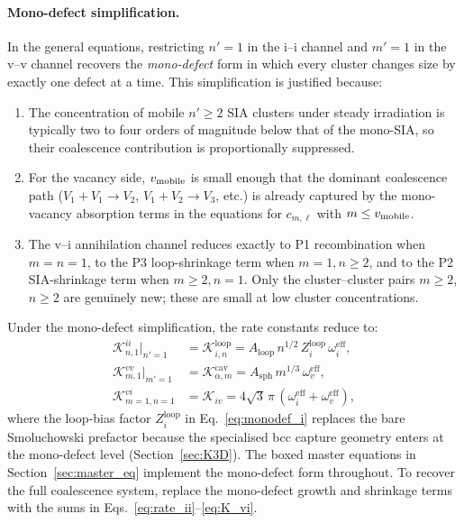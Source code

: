 \documentclass[pdflatex,sn-basic]{sn-jnl} %
\begin{document}
\paragraph{Mono-defect simplification.}
In the general equations, restricting $n' = 1$ in the i--i channel and
$m' = 1$ in the v--v channel recovers the \emph{mono-defect} form in which
every cluster changes size by exactly one defect at a time. This
simplification is justified because:
\begin{enumerate}
    \item The concentration of mobile $n' \geq 2$ SIA clusters under steady
    irradiation is typically two to four orders of magnitude below that of
    the mono-SIA, so their coalescence contribution is proportionally
    suppressed.
    \item For the vacancy side, $v_{\rm mobile}$ is small enough that the
    dominant coalescence path ($V_1 + V_1 \to V_2$, $V_1 + V_2 \to V_3$,
    etc.) is already captured by the mono-vacancy absorption terms in the
    equations for $c_{m,\ell}$ with $m \leq v_{\rm mobile}$.
    \item The v--i annihilation channel reduces exactly to P1 recombination
    when $m = n = 1$, to the P3 loop-shrinkage term when $m = 1, n \geq 2$,
    and to the P2 SIA-shrinkage term when $m \geq 2, n = 1$. Only the
    cluster--cluster pairs $m \geq 2$, $n \geq 2$ are genuinely new; these
    are small at low cluster concentrations.
\end{enumerate}
Under the mono-defect simplification, the rate constants reduce to:
\begin{align}
    \mathcal{K}_{n,1}^{ii}\big|_{n'=1}
    &= \mathcal{K}_{i,n}^{\mathrm{loop}}
     = A_{\mathrm{loop}}\,n^{1/2}\,Z_i^{\mathrm{loop}}\,\omega_i^{\mathrm{eff}},
    \label{eq:monodef_i}\\[4pt]
    \mathcal{K}_{m,1}^{vv}\big|_{m'=1}
    &= \mathcal{K}_{\alpha,m}^{\mathrm{cav}}
     = A_{\mathrm{sph}}\,m^{1/3}\,\omega_v^{\mathrm{eff}},
    \label{eq:monodef_v}\\[4pt]
    \mathcal{K}_{m=1,n=1}^{vi}
    &= \mathcal{K}_{iv}
     = 4\sqrt{3}\,\pi\,(\omega_i^{\mathrm{eff}}+\omega_v^{\mathrm{eff}}),
    \label{eq:monodef_iv}
\end{align}
where the loop-bias factor $Z_i^{\mathrm{loop}}$ in
Eq.~\eqref{eq:monodef_i} replaces the bare Smoluchowski prefactor because
the specialised bcc capture geometry enters at the mono-defect level
(Section~\ref{sec:K3D}). The boxed master equations in
Section~\ref{sec:master_eq} implement the mono-defect form throughout. To
recover the full coalescence system, replace the mono-defect growth and
shrinkage terms with the sums in
Eqs.~\eqref{eq:rate_ii}--\eqref{eq:K_vi}.
\end{document}
